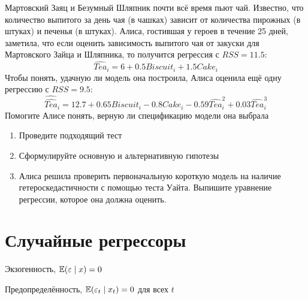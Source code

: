 \documentclass[pdftex,11pt,openany]{book}\usepackage[]{graphicx}\usepackage[]{color}
\begin{document}
\begin{solution}
\end{solution}






\begin{problem}
Мартовский Заяц и Безумный Шляпник почти всё время пьют чай. Известно, что количество выпитого за день чая (в чашках) зависит от количества пирожных (в штуках) и печенья (в штуках).
Алиса, гостившая у героев в течение 25 дней, заметила, что если оценить зависимость выпитого чая от закуски для Мартовского Зайца и Шляпника, то получится регрессия с $RSS=11.5$:
\[
\widehat{Tea}_i=6+0.5Biscuit_i+1.5Cake_i
\] 
Чтобы понять, удачную ли модель она построила,  Алиса оценила ещё одну регрессию с $RSS=9.5$: 
\[
\widehat{\widehat{Tea}}_i=12.7+0.65Biscuit_i-0.8Cake_i-0.59\widehat{Tea}^2_i+0.03\widehat{Tea}^3_i
\]
Помогите Алисе понять, верную ли спецификацию модели она выбрала
\begin{enumerate}
\item Проведите подходящий тест 
\item Сформулируйте основную и альтернативную гипотезы
\item Алиса решила проверить первоначальную короткую модель на наличие гетероскедастичности с помощью теста Уайта. Выпишите уравнение регрессии, которое она должна оценить.
\end{enumerate}
\end{problem}

\begin{solution}
\end{solution}



%


\chapter{Случайные регрессоры}

\begin{problemtext}

Экзогенность, $\mathbb{E}(\varepsilon\mid x)=0$

Предопределённость, $\mathbb{E}(\varepsilon_t\mid x_t)=0$ для всех $t$
\end{problemtext}
\end{document}

